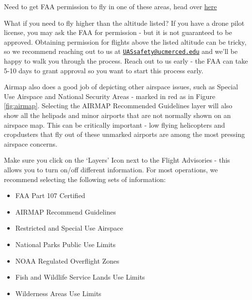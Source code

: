 \documentclass[
  12pt,
]{book}
\providecommand{\tightlist}{%
  \setlength{\itemsep}{0pt}\setlength{\parskip}{0pt}}
\newenvironment{notebox}{
  \definecolor{shadecolor}{gray}{.8}  %
  \color{black}
  \begin{shaded}}
 {\end{shaded}}
\begin{document}
\begin{notebox}
Need to get FAA permission to fly in one of these areas, head over \protect\hyperlink{LAANC}{here}

\end{notebox}

What if you need to fly higher than the altitude listed? If you have a drone pilot license, you may ask the FAA for permission - but it is not guaranteed to be approved. Obtaining permission for flights above the listed altitude can be tricky, so we recommend reaching out to us at \href{mailto:UASsafety@ucmerced.edu}{\nolinkurl{UASsafety@ucmerced.edu}} and we'll be happy to walk you through the process. Reach out to us early - the FAA can take 5-10 days to grant approval so you want to start this process early.

Airmap also does a good job of depicting other airspace issues, such as Special Use Airspace and National Security Areas - marked in red as in Figure \ref{fig:airmap}. Selecting the AIRMAP Recommended Guidelines layer will also show all the helipads and minor airports that are not normally shown on an airspace map. This can be critically important - low flying helicopters and cropdusters that fly out of these unmarked airports are among the most pressing airspace concerns.

\begin{notebox}

Make sure you click on the `Layers' Icon next to the Flight Advisories - this allows you to turn on/off different information. For most operations, we recommend selecting the following sets of information:

\begin{itemize}
\tightlist
\item
  FAA Part 107 Certified
\item
  AIRMAP Recommend Guidelines
\item
  Restricted and Special Use Airspace
\item
  National Parks Public Use Limits
\item
  NOAA Regulated Overflight Zones
\item
  Fish and Wildlife Service Lands Use Limits
\item
  Wilderness Areas Use Limits
\end{itemize}

\end{notebox}
\end{document}
